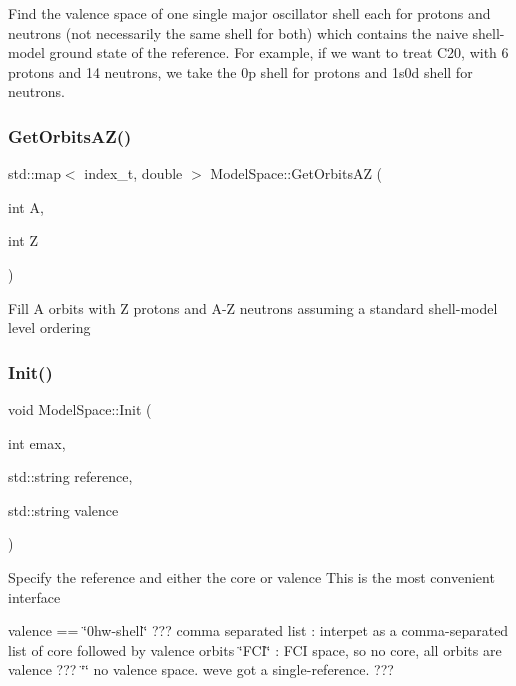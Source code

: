 Find the valence space of one single major oscillator shell each for protons and neutrons (not necessarily the same shell for both) which contains the naive shell-\/model ground state of the reference. For example, if we want to treat C20, with 6 protons and 14 neutrons, we take the 0p shell for protons and 1s0d shell for neutrons. \mbox{\label{classModelSpace_a0cecf7817ce2bbf6c278924fd458e851}} 
\subsubsection{\texorpdfstring{Get\+Orbits\+A\+Z()}{GetOrbitsAZ()}}
{\footnotesize\ttfamily std\+::map$<$ index\+\_\+t, double $>$ Model\+Space\+::\+Get\+Orbits\+AZ (\begin{DoxyParamCaption}\item[{int}]{A,  }\item[{int}]{Z }\end{DoxyParamCaption})}

Fill A orbits with Z protons and A-\/Z neutrons assuming a standard shell-\/model level ordering \mbox{\label{classModelSpace_aabf0b2634707a056eaf3f387ae837b86}} 
\subsubsection{\texorpdfstring{Init()}{Init()}\hspace{0.1cm}{\footnotesize\ttfamily [1/3]}}
{\footnotesize\ttfamily void Model\+Space\+::\+Init (\begin{DoxyParamCaption}\item[{int}]{emax,  }\item[{std\+::string}]{reference,  }\item[{std\+::string}]{valence }\end{DoxyParamCaption})}

Specify the reference and either the core or valence This is the most convenient interface

valence == \char`\"{}0hw-\/shell\char`\"{} ??? comma separated list \+: interpet as a comma-\/separated list of core followed by valence orbits \char`\"{}\+F\+C\+I\char`\"{} \+: F\+CI space, so no core, all orbits are valence ??? \char`\"{}\char`\"{} no valence space. we\textquotesingle{}ve got a single-\/reference. ??? \mbox{\label{classModelSpace_a134f18c926b82b66a59811f6a47e1db8}} 
